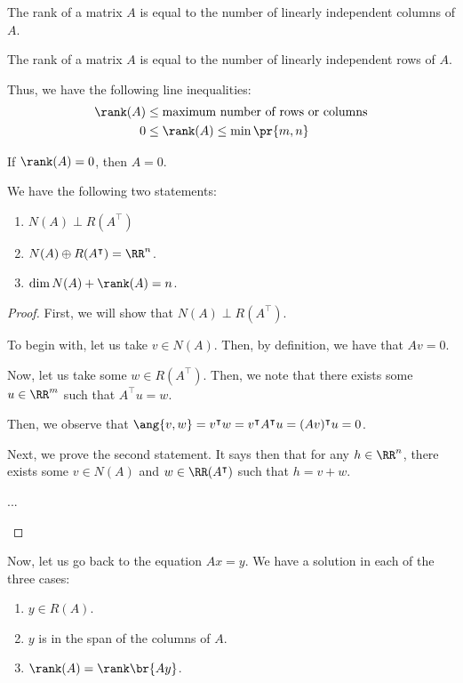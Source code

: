 \documentclass[openany]{book}
\begin{document}
\begin{thm}
	The rank of a matrix $A$ is equal to the number of linearly independent columns of $A$.
\end{thm}
\begin{cor}
	The rank of a matrix $A$ is equal to the number of linearly independent rows of $A$.
\end{cor}

Thus, we have the following line inequalities:
\begin{align*}
	\rank(A) &\leq \text{maximum number of rows or columns} \\
	0 &\leq \rank(A) \leq \min\pr{m, n}
\end{align*}

\begin{cor}
	If $\rank (A) = 0$, then $A = 0$.
\end{cor}

\begin{thm}
	We have the following two statements:
	\begin{enumerate}
		\item $N(A) \perp R(A^{\intercal})$
		\item $N(A) \oplus R(A^{\intercal}) = \RR^{n}$.
		\item $\dim N(A) + \rank (A) = n$.
	\end{enumerate}
\end{thm}
\begin{proof}
	First, we will show that $N(A) \perp R(A^{\intercal})$.
	\begin{innerproof}
		To begin with, let us take $v \in N(A)$. Then, by definition, we have that $Av = 0$. 
		
		Now, let us take some $w \in R(A^{\intercal})$. Then, we note that there exists some $u \in \RR^{m}$ such that $A^{\intercal}u = w$.
		
		Then, we observe that $\ang{v,w} = v^{\intercal}w = v^{\intercal}A^{\intercal}u = (Av)^{\intercal}u = 0$.
	\end{innerproof}

	Next, we prove the second statement. It says then that for any $h \in \RR^{n}$, there exists some $v \in N(A)$ and $w \in \RR(A^{\intercal})$ such that $h = v + w$.
	\begin{innerproof}
	...
	\end{innerproof}
\end{proof}

Now, let us go back to the equation $Ax = y$. We have a solution in each of the three cases:
\begin{enumerate}
	\item $y \in R(A)$.
	\item $y$ is in the span of the columns of $A$.
	\item $\rank (A) = \rank \br{A y}$.
\end{enumerate}
\end{document}
